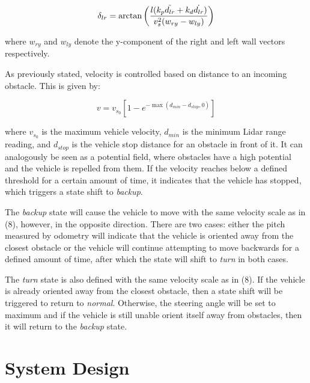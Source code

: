 \documentclass[conference]{IEEEtran}
\begin{document}
\begin{equation}
    \begin{aligned}
        \delta_{lr} = \arctan \left( \frac{l(k_p \Tilde{d_{lr}}+ k_d \dot{d_{lr}})}{v_s^2(w_{ry} - w_{ly})} \right)
    \end{aligned}
\end{equation}

where $w_{ry}$ and $w_{ly}$ denote the y-component of the right and left wall vectors respectively.  



As previously stated, velocity is controlled based on distance to an incoming obstacle. This is given by:

\begin{equation}
    v = v_{s_0}\left[1-e^{-\max(d_{min}-d_{stop},0)}\right]
\end{equation}

where $v_{s_0}$ is the maximum vehicle velocity, $d_{min}$ is the minimum Lidar range reading, and $d_{stop}$ is the vehicle stop distance for an obstacle in front of it. It can analogously be seen as a potential field, where obstacles have a high potential and  the vehicle is repelled from them. If the velocity reaches below a defined threshold for a certain amount of time, it indicates that the vehicle has stopped, which triggers a state shift to \textit{backup}. 

The \textit{backup} state will cause the vehicle to move with the same velocity scale as in (8), however, in the opposite direction. There are two cases: either the pitch measured by odometry will indicate that the vehicle is oriented away from the closest obstacle or the vehicle will continue attempting to move backwards for a defined amount of time, after which the state will shift to \textit{turn} in both cases.

The \textit{turn} state is also defined with the same velocity scale as in (8). If the vehicle is already oriented away from the closest obstacle, then a state shift will be triggered to return to \textit{normal}. Otherwise, the steering angle will be set to maximum and if the vehicle is still unable orient itself away from obstacles, then it will return to the \textit{backup} state.

\section{System Design}
\end{document}
